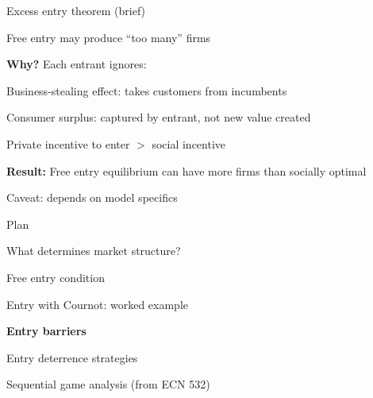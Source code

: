 \documentclass[notes,11pt, aspectratio=169]{beamer}
\newenvironment{wideitemize}{\itemize\addtolength{\itemsep}{10pt}}{\enditemize}
\newenvironment{wideenumerate}{\enumerate\addtolength{\itemsep}{10pt}}{\endenumerate}
\begin{document}
\begin{frame}{Excess entry theorem (brief)}
	\begin{wideitemize}
		\item Free entry may produce ``too many'' firms
		\item \textbf{Why?} Each entrant ignores:
		\begin{wideenumerate}
			\vspace{5pt}
			\item Business-stealing effect: takes customers from incumbents
			\item Consumer surplus: captured by entrant, not new value created
		\end{wideenumerate}
		\item Private incentive to enter $>$ social incentive
		\item \textbf{Result:} Free entry equilibrium can have more firms than socially optimal
		\item Caveat: depends on model specifics
	\end{wideitemize}
\end{frame}


\begin{frame}{Plan}
  \begin{wideenumerate}
    \item What determines market structure?
    \item Free entry condition
    \item Entry with Cournot: worked example
    \item \textbf{Entry barriers}
    \item Entry deterrence strategies
    \item Sequential game analysis (from ECN 532)
  \end{wideenumerate}
\end{frame}
\end{document}
